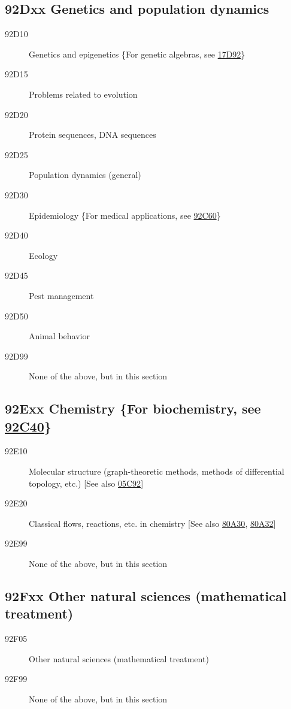 \subsection*{92Dxx  Genetics and population dynamics }\label{92Dxx}
\begin{description}  
\item [92D10]\label{92D10} Genetics and epigenetics \{For genetic algebras, see \hyperref[17D92]{17D92}\}
\item [92D15]\label{92D15} Problems related to evolution
\item [92D20]\label{92D20} Protein sequences, DNA sequences
\item [92D25]\label{92D25} Population dynamics (general)
\item [92D30]\label{92D30} Epidemiology \{For medical applications, see \hyperref[92C60]{92C60}\}
\item [92D40]\label{92D40} Ecology
\item [92D45]\label{92D45} Pest management
\item [92D50]\label{92D50} Animal behavior
\item [92D99]\label{92D99} None of the above, but in this section
\end{description}
\subsection*{92Exx  Chemistry \{For biochemistry, see \hyperref[92C40]{92C40}\} }\label{92Exx}
\begin{description}  
\item [92E10]\label{92E10} Molecular structure (graph-theoretic methods, methods of differential topology, etc.) [See also \hyperref[05C92]{05C92}]
\item [92E20]\label{92E20} Classical flows, reactions, etc. in chemistry [See also \hyperref[80A30]{80A30}, \hyperref[80A32]{80A32}]
\item [92E99]\label{92E99} None of the above, but in this section
\end{description}
\subsection*{92Fxx  Other natural sciences (mathematical treatment) }\label{92Fxx}
\begin{description}  
\item [92F05]\label{92F05} Other natural sciences (mathematical treatment)
\item [92F99]\label{92F99} None of the above, but in this section
\end{description}
